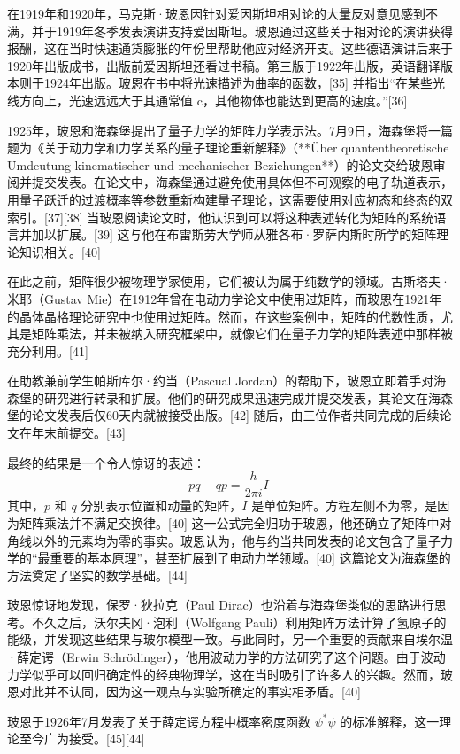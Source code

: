 在1919年和1920年，马克斯·玻恩因针对爱因斯坦相对论的大量反对意见感到不满，并于1919年冬季发表演讲支持爱因斯坦。玻恩通过这些关于相对论的演讲获得报酬，这在当时快速通货膨胀的年份里帮助他应对经济开支。这些德语演讲后来于1920年出版成书，出版前爱因斯坦还看过书稿。第三版于1922年出版，英语翻译版本则于1924年出版。玻恩在书中将光速描述为曲率的函数，[35] 并指出“在某些光线方向上，光速远远大于其通常值 c，其他物体也能达到更高的速度。”[36]

1925年，玻恩和海森堡提出了量子力学的矩阵力学表示法。7月9日，海森堡将一篇题为《关于动力学和力学关系的量子理论重新解释》（**Über quantentheoretische Umdeutung kinematischer und mechanischer Beziehungen**）的论文交给玻恩审阅并提交发表。在论文中，海森堡通过避免使用具体但不可观察的电子轨道表示，用量子跃迁的过渡概率等参数重新构建量子理论，这需要使用对应初态和终态的双索引。[37][38] 当玻恩阅读论文时，他认识到可以将这种表述转化为矩阵的系统语言并加以扩展。[39] 这与他在布雷斯劳大学师从雅各布·罗萨内斯时所学的矩阵理论知识相关。[40]

在此之前，矩阵很少被物理学家使用，它们被认为属于纯数学的领域。古斯塔夫·米耶（Gustav Mie）在1912年曾在电动力学论文中使用过矩阵，而玻恩在1921年的晶体晶格理论研究中也使用过矩阵。然而，在这些案例中，矩阵的代数性质，尤其是矩阵乘法，并未被纳入研究框架中，就像它们在量子力学的矩阵表述中那样被充分利用。[41] 

在助教兼前学生帕斯库尔·约当（Pascual Jordan）的帮助下，玻恩立即着手对海森堡的研究进行转录和扩展。他们的研究成果迅速完成并提交发表，其论文在海森堡的论文发表后仅60天内就被接受出版。[42] 随后，由三位作者共同完成的后续论文在年末前提交。[43] 

最终的结果是一个令人惊讶的表述：
\[
pq - qp = \frac{h}{2\pi i}I~
\]
其中，\(p\) 和 \(q\) 分别表示位置和动量的矩阵，\(I\) 是单位矩阵。方程左侧不为零，是因为矩阵乘法并不满足交换律。[40] 这一公式完全归功于玻恩，他还确立了矩阵中对角线以外的元素均为零的事实。玻恩认为，他与约当共同发表的论文包含了量子力学的“最重要的基本原理”，甚至扩展到了电动力学领域。[40] 这篇论文为海森堡的方法奠定了坚实的数学基础。[44]

玻恩惊讶地发现，保罗·狄拉克（Paul Dirac）也沿着与海森堡类似的思路进行思考。不久之后，沃尔夫冈·泡利（Wolfgang Pauli）利用矩阵方法计算了氢原子的能级，并发现这些结果与玻尔模型一致。与此同时，另一个重要的贡献来自埃尔温·薛定谔（Erwin Schrödinger），他用波动力学的方法研究了这个问题。由于波动力学似乎可以回归确定性的经典物理学，这在当时吸引了许多人的兴趣。然而，玻恩对此并不认同，因为这一观点与实验所确定的事实相矛盾。[40] 

玻恩于1926年7月发表了关于薛定谔方程中概率密度函数 \( \psi^*\psi \) 的标准解释，这一理论至今广为接受。[45][44]

